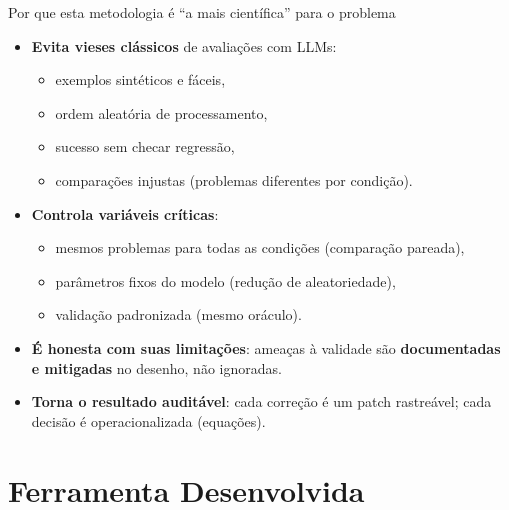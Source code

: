 \documentclass[aspectratio=169]{beamer}
\begin{document}
\begin{frame}{Por que esta metodologia é ``a mais científica'' para o problema}
\small
\begin{itemize}
  \item \textbf{Evita vieses clássicos} de avaliações com LLMs:
  \begin{itemize}
    \item exemplos sintéticos e fáceis,
    \item ordem aleatória de processamento,
    \item sucesso sem checar regressão,
    \item comparações injustas (problemas diferentes por condição).
  \end{itemize}
  \item \textbf{Controla variáveis críticas}:
  \begin{itemize}
    \item mesmos problemas para todas as condições (comparação pareada),
    \item parâmetros fixos do modelo (redução de aleatoriedade),
    \item validação padronizada (mesmo oráculo).
  \end{itemize}
  \item \textbf{É honesta com suas limitações}: ameaças à validade são
        \textbf{documentadas e mitigadas} no desenho, não ignoradas.
  \item \textbf{Torna o resultado auditável}:
  cada correção é um patch rastreável;
  cada decisão é operacionalizada (equações).
\end{itemize}
\end{frame}

\section{Ferramenta Desenvolvida}
\end{document}
